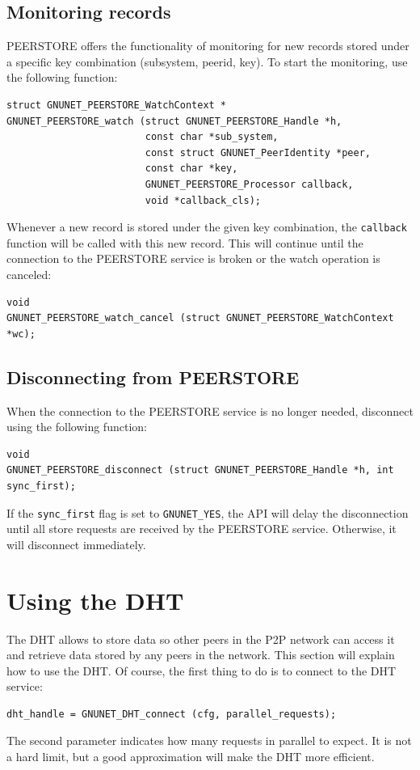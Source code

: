 \documentclass[10pt]{article}
\begin{document}
\subsection{Monitoring records}

PEERSTORE offers the functionality of monitoring for new records stored under a specific key
combination (subsystem, peerid, key). To start the monitoring, use the following function:
\begin{lstlisting}
struct GNUNET_PEERSTORE_WatchContext *
GNUNET_PEERSTORE_watch (struct GNUNET_PEERSTORE_Handle *h,
                        const char *sub_system,
                        const struct GNUNET_PeerIdentity *peer,
                        const char *key,
                        GNUNET_PEERSTORE_Processor callback,
                        void *callback_cls);
\end{lstlisting}

Whenever a new record is stored under the given key combination, the \lstinline|callback| function
will be called with this new record. This will continue until the connection to the PEERSTORE service
is broken or the watch operation is canceled:
\begin{lstlisting}
void
GNUNET_PEERSTORE_watch_cancel (struct GNUNET_PEERSTORE_WatchContext *wc);
\end{lstlisting}

\subsection{Disconnecting from PEERSTORE}

When the connection to the PEERSTORE service is no longer needed, disconnect using the following
function:
\begin{lstlisting}
void
GNUNET_PEERSTORE_disconnect (struct GNUNET_PEERSTORE_Handle *h, int sync_first);
\end{lstlisting}

If the \lstinline|sync_first| flag is set to \lstinline|GNUNET_YES|, the API will delay the
disconnection until all store requests are received by the PEERSTORE service. Otherwise,
it will disconnect immediately.


\section{Using the DHT}

The DHT allows to store data so other peers in the P2P network can
access it and retrieve data stored by any peers in the network.
This section will explain how to use the DHT. Of course, the first
thing to do is to connect to the DHT service:
\lstset{language=C}
\begin{lstlisting}
dht_handle = GNUNET_DHT_connect (cfg, parallel_requests);
\end{lstlisting}
The second parameter indicates how many requests in parallel to expect.
It is not a hard limit, but a good approximation will make the DHT more
efficient.
\end{document}

